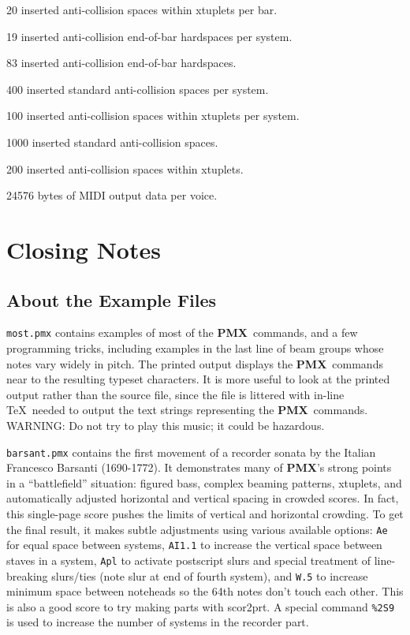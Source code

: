 \documentclass[11pt]{article}
\newcommand\PMXX{\textbf{PMX}}
\newcommand\PMX{\PMXX~}
\def\newfrom{2.59}  %
\def\NEW#1{\ifdim#1 pt<\newfrom pt\else%
\marginpar{\fbox{#1}}\fi}
\begin{document}
20 inserted anti-collision spaces within xtuplets per bar.
 
19 inserted anti-collision end-of-bar hardspaces per system.

83 inserted anti-collision end-of-bar hardspaces.

400 inserted standard anti-collision spaces per system.

100 inserted anti-collision spaces within xtuplets per system.

1000 inserted standard anti-collision spaces.

200 inserted anti-collision spaces within xtuplets.

24576 \NEW{2.2} bytes of MIDI output data per voice.

\section{Closing Notes}

\subsection{About the Example Files}

{\tt most.pmx} contains examples of most of the \PMX commands, and a few
programming tricks, including examples in the last line of beam groups whose
notes vary widely in pitch.  The printed
output displays the \PMX commands near to the resulting typeset characters.  
It is more
useful to look at the printed output rather than the source file, since the
file is littered with in-line \TeX ~needed to output the text strings 
representing the \PMX commands.
{\bfx WARNING:} Do not try to play this music; it could be hazardous.

{\tt barsant.pmx} contains the first movement of a recorder sonata by the
Italian Francesco Barsanti (1690-1772).  It demonstrates many of \PMXX 's
strong points in a ``battlefield'' situation:  figured
bass, complex beaming patterns, xtuplets, and  
automatically adjusted horizontal and vertical spacing in crowded scores.  
In fact, 
this single-page score pushes the limits of vertical and horizontal crowding. 
To get the final result, it makes subtle adjustments using various available options: 
{\tt Ae} for equal space between systems, {\tt AI1.1} to increase the vertical 
space between staves in a system, {\tt Apl} to activate postscript slurs and 
special treatment of line-breaking slurs/ties (note slur at end of fourth
system), and {\tt W.5} to increase minimum space between noteheads so the 64th
notes don't touch each other. This is also a 
good score to try making parts with {\bfx scor2prt}. A special command
{\tt \%2S9} is used to increase the number of systems in the recorder part. 
\end{document}
